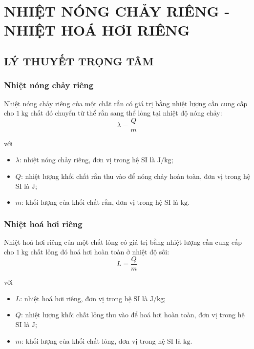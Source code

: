\section{NHIỆT NÓNG CHẢY RIÊNG - NHIỆT HOÁ HƠI RIÊNG}
\subsection{LÝ THUYẾT TRỌNG TÂM}
\subsubsection{Nhiệt nóng chảy riêng}
\begin{boxdl}
	Nhiệt nóng chảy riêng của một chất rắn có giá trị bằng nhiệt lượng cần cung cấp cho $\SI{1}{\kilogram}$ chất đó chuyển từ thể rắn sang thể lỏng tại nhiệt độ nóng chảy:
	\begin{equation}
		\lambda=\dfrac{Q}{m}
	\end{equation}
\end{boxdl}
với
\begin{itemize}
	\item $\lambda$: nhiệt nóng chảy riêng, đơn vị trong hệ SI là $\si{\joule/\kilogram}$;
	\item $Q$: nhiệt lượng khối chất rắn thu vào để nóng chảy hoàn toàn, đơn vị trong hệ SI là $\si{\joule}$;
	\item $m$: khối lượng của khối chất rắn, đơn vị trong hệ SI là $\si{\kilogram}$.
\end{itemize}
\subsubsection{Nhiệt hoá hơi riêng}
\begin{boxdl}
	Nhiệt hoá hơi riêng của một chất lỏng có giá trị bằng nhiệt lượng cần cung cấp cho $\SI{1}{\kilogram}$ chất lỏng đó hoá hơi hoàn toàn ở nhiệt độ sôi:
	\begin{equation}
		L=\dfrac{Q}{m}
	\end{equation}
\end{boxdl}
với
\begin{itemize}
	\item $L$: nhiệt hoá hơi riêng, đơn vị trong hệ SI là $\si{\joule/\kilogram}$;
	\item $Q$: nhiệt lượng khối chất lỏng thu vào để hoá hơi hoàn toàn, đơn vị trong hệ SI là $\si{\joule}$;
	\item $m$: khối lượng của khối chất lỏng, đơn vị trong hệ SI là $\si{\kilogram}$.
\end{itemize}
